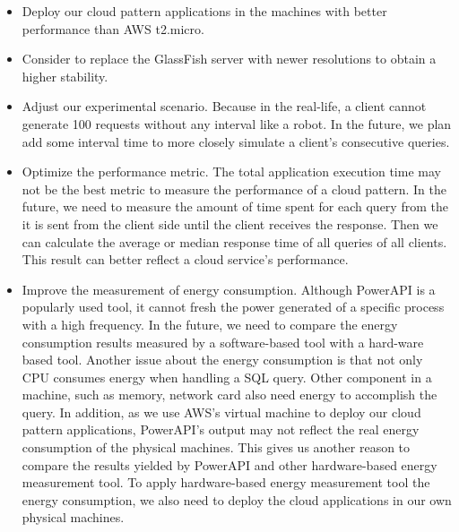 \documentclass{article}
\begin{document}
\begin{itemize}
\item Deploy our cloud pattern applications in the machines with better performance than AWS t2.micro.
\item Consider to replace the GlassFish server with newer resolutions to obtain a higher stability. 
\item Adjust our experimental scenario. Because in the real-life, a client cannot generate 100 requests without any interval like a robot. In the future, we plan add some interval time to more closely simulate a client's consecutive queries. 
\item Optimize the performance metric. The total application execution time may not be the best metric to measure the performance of a cloud pattern. In the future, we need to measure the amount of time spent for each query from the it is sent from the client side until the client receives the response. Then we can calculate the average or median response time of all queries of all clients. This result can better reflect a cloud service's performance.
\item Improve the measurement of energy consumption. Although PowerAPI is a popularly used tool, it cannot fresh the power generated of a specific process with a high frequency. In the future, we need to compare the energy consumption results measured by a software-based tool with a hard-ware based tool. Another issue about the energy consumption is that not only CPU consumes energy when handling a SQL query. Other component in a machine, such as memory, network card also need energy to accomplish the query. In addition, as we use AWS's virtual machine to deploy our cloud pattern applications, PowerAPI's output may not reflect the real energy consumption of the physical machines. This gives us another reason to compare the results yielded by PowerAPI and other hardware-based energy measurement tool. To apply hardware-based energy measurement tool the energy consumption, we also need to deploy the cloud applications in our own physical machines. 
\end{itemize}



\end{document}
